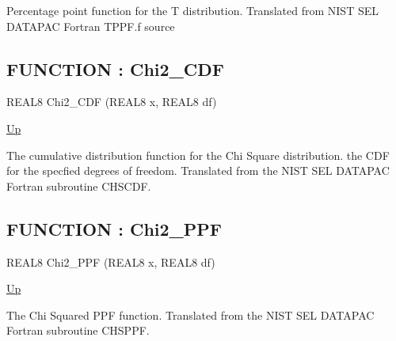 \par
Percentage point function for the T distribution. Translated from NIST SEL DATAPAC Fortran TPPF.f source
\par
\subsection*{FUNCTION : Chi2\_CDF}
\hypertarget{ecldoc:logisticregression.distributions.chi2_cdf}{}
\begin{minipage}[t]{\textwidth}
\begin{flushleft}
REAL8 Chi2\_CDF (REAL8 x, REAL8 df)
\end{flushleft}
\end{minipage}
\hyperlink{ecldoc:LogisticRegression.Distributions}{Up}

\par
The cumulative distribution function for the Chi Square distribution. the CDF for the specfied degrees of freedom. Translated from the NIST SEL DATAPAC Fortran subroutine CHSCDF.
\par
\subsection*{FUNCTION : Chi2\_PPF}
\hypertarget{ecldoc:logisticregression.distributions.chi2_ppf}{}
\begin{minipage}[t]{\textwidth}
\begin{flushleft}
REAL8 Chi2\_PPF (REAL8 x, REAL8 df)
\end{flushleft}
\end{minipage}
\hyperlink{ecldoc:LogisticRegression.Distributions}{Up}

\par
The Chi Squared PPF function. Translated from the NIST SEL DATAPAC Fortran subroutine CHSPPF.
\par

